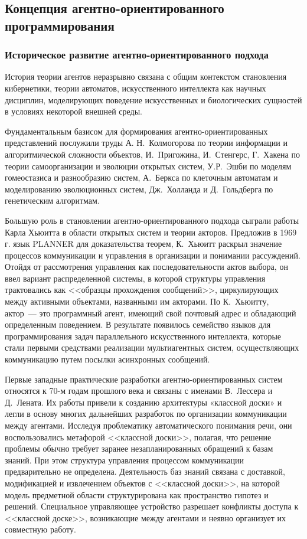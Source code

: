 \subsection{Концепция агентно-ориентированного программирования}
\subsubsection{Историческое развитие агентно-ориентированного подхода}
История теории агентов неразрывно связана с общим контекстом становления кибернетики, теории автоматов, искусственного интеллекта как научных дисциплин, моделирующих поведение искусственных и биологических сущностей в условиях некоторой внешней среды.

Фундаментальным базисом для формирования агентно-ориентированных представлений послужили труды А. Н.~Колмогорова по теории информации и алгоритмической сложности объектов, И.~Пригожина, И.~Стенгерс, Г.~Хакена по теории самоорганизации и эволюции открытых систем, У.Р.~Эшби по моделям гомеостазиса и разнообразию систем, А.~Беркса по клеточным автоматам и моделированию эволюционных систем, Дж.~Холланда и Д.~Гольдберга по генетическим алгоритмам.

Большую роль в становлении агентно-ориентированного подхода сыграли работы Карла Хьюитта в области открытых систем и теории акторов. Предложив в 1969 г. язык PLANNER для доказательства теорем, К.~Хьюитт раскрыл значение процессов коммуникации и управления в организации и понимании рассуждений. Отойдя от рассмотрения управления как последовательности актов выбора, он ввел вариант распределенной системы, в которой структуры управления трактовались как <<образцы прохождения сообщений>>, циркулирующих между активными объектами, названными им акторами. По К.~Хьюитту, актор~--- это программный агент, имеющий свой почтовый адрес и обладающий определенным поведением. В результате появилось семейство языков для программирования задач параллельного искусственного интеллекта, которые стали первыми средствами реализации мультиагентных систем, осуществляющих коммуникацию путем посылки асинхронных сообщений.

Первые западные практические разработки агентно-ориентированных систем  относятся к 70-м годам прошлого века и связаны с именами В.~Лессера и Д.~Лената. Их работы привели к созданию архитектуры «классной доски» и легли в основу многих дальнейших разработок по организации коммуникации между агентами. Исследуя проблематику автоматического понимания речи, они воспользовались метафорой <<классной доски>>, полагая, что решение проблемы обычно требует заранее незапланированных обращений к базам знаний. При этом структура управления процессом коммуникации предварительно не определена. Деятельность баз знаний связана с доставкой, модификацией и извлечением объектов с <<классной доски>>, на которой модель предметной области структурирована как пространство гипотез и решений. Специальное управляющее устройство разрешает конфликты доступа к <<классной доске>>, возникающие между агентами и неявно организует их совместную работу.

